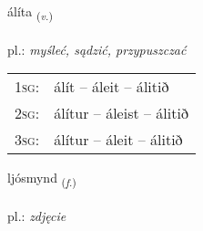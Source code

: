 \documentclass[frontgrid, backgrid]{flacards}\usepackage[]{graphicx}\usepackage[]{xcolor}
\begin{document}
\renewcommand{\flhead}{\vskip5pt \fboxsep=0pt {\small\bfseries\footnotesize Sagnorð | Verb}}
\renewcommand{\fcfoot}{\vskip5pt \fboxsep=0pt \hspace{2pt}{\small\bfseries\footnotesize 2K}}

\renewcommand{\blhead}{\vskip5pt {\small\bfseries\footnotesize Sagnorð | Verb }}
\renewcommand{\bcfoot}{\vskip5pt \hspace{2pt}{\small\bfseries\footnotesize 2K}}


{álíta \small{\textsubscript{(\textit{v.})}} \\[1ex] %
\textphonetic{[auːlita]} \\
pl.: \emph{myśleć, sądzić, przypuszczać} \\  [2ex]
\renewcommand*{\arraystretch}{0.8}
\begin{tabular}{p{1cm}l}
\textsc{1sg}: & álít -- áleit -- álitið \\ 
\textsc{2sg}: & álítur -- áleist -- álitið \\ 
\textsc{3sg}: & álítur -- áleit -- álitið \\ 
\end{tabular}
}

\renewcommand{\flhead}{\vskip5pt \fboxsep=0pt {\small\bfseries\footnotesize Nafnorð | Noun}}
\renewcommand{\fcfoot}{\vskip5pt \fboxsep=0pt \hspace{2pt}{\small\bfseries\footnotesize 2K}}

\renewcommand{\blhead}{\vskip5pt {\small\bfseries\footnotesize Nafnorð | Noun }}
\renewcommand{\bcfoot}{\vskip5pt \hspace{2pt}{\small\bfseries\footnotesize 2K}}


{ljósmynd \small{\textsubscript{(\textit{f.})}} \\[1ex] %
\textphonetic{[ljousmɪnt]} \\
pl.: \emph{zdjęcie} \\  [2ex]
\renewcommand*{\arraystretch}{0.8}
}
\end{document}
